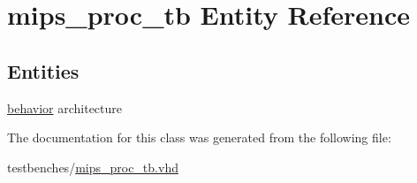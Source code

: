 \hypertarget{classmips__proc__tb}{\section{mips\-\_\-proc\-\_\-tb \-Entity \-Reference}
\label{classmips__proc__tb}
}
\subsection*{\-Entities}
\begin{DoxyCompactItemize}
\item 
\hyperlink{classmips__proc__tb_1_1behavior}{behavior} architecture
\end{DoxyCompactItemize}


\-The documentation for this class was generated from the following file\-:\begin{DoxyCompactItemize}
\item 
testbenches/\hyperlink{mips__proc__tb_8vhd}{mips\-\_\-proc\-\_\-tb.\-vhd}\end{DoxyCompactItemize}

